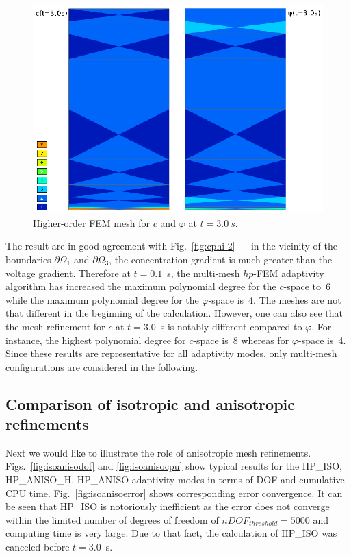 \begin{figure}[!ht]
  \begin{centering}
  \includegraphics[width=.75\columnwidth]{poly2}
  \caption{\label{fig:poly2} Higher-order FEM mesh for 
  $c$ and $\varphi$ at $t=3.0\ s$. }
  \end{centering}
\end{figure}
\noindent
The result are in good agreement with Fig.~\ref{fig:cphi-2} --- in the vicinity
of the boundaries $\partial \Omega_1$ and $\partial\Omega_3$, the concentration gradient
is much greater than the voltage gradient. Therefore at $t=0.1$~s, 
the multi-mesh $hp$-FEM adaptivity 
algorithm has increased the maximum polynomial degree for the $c$-space to~6 while 
the maximum polynomial degree for the $\varphi$-space is~4. The meshes are not
that different in the beginning of the calculation. However, one can also see that the mesh 
refinement for $c$ at $t=3.0$~s is notably different compared to $\varphi$. For instance,
the highest polynomial degree for $c$-space is~8 whereas for $\varphi$-space is~4.
Since these results are representative for all adaptivity modes, only multi-mesh 
configurations are considered in the following. 

\subsection{Comparison of isotropic and anisotropic refinements}

Next we would like to illustrate the role of anisotropic mesh refinements.
Figs.~\ref{fig:isoanisodof} and \ref{fig:isoanisocpu} show typical results 
for the HP\_ISO, HP\_ANISO\_H,  HP\_ANISO adaptivity modes in terms 
of DOF and cumulative CPU time. Fig.~\ref{fig:isoanisoerror} shows corresponding
error convergence. It can be seen that HP\_ISO is notoriously inefficient as the
error does not converge within the limited number of degrees of freedom 
of $nDOF_{threshold}=5000$ and computing time is very large. Due to that fact,
the calculation of HP\_ISO was canceled before $t=3.0$~s.

